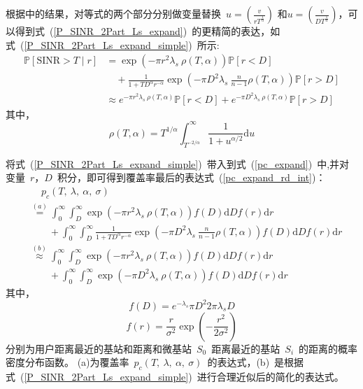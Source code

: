 根据\cite{ATractable}中的结果，对等式的两个部分分别做变量替换~$u=\left(\frac{v}{rT^{\frac{1}{\alpha}}}\right)$
和$u=\left(\frac{v}{DT^{\frac{1}{\alpha}}}\right)$，可以得到式~(\ref{P_SINR_2Part_Ls_expand})~的更精简的表达，如式~(\ref{P_SINR_2Part_Ls_expand_simple})~所示:
\begin{equation}\label{P_SINR_2Part_Ls_expand_simple}
  \begin{aligned}
  \mathbb{P}[\mathrm{SINR}>T \mid r] &= \exp\left(-\pi r^2\lambda_s\  \rho(T,\alpha)  \right)\mathbb{P}[r<D] \\
     &\quad + \frac{1}{1+ T D ^\alpha r^{-\alpha}} \exp\left(-\pi D ^2 \lambda_s\ \frac{n}{n-1} \rho(T,\alpha)\right)\mathbb{P}[r>D]\\
    &\approx  e^{-\pi r^2\lambda_s\  \rho(T,\alpha)  }\mathbb{P}[r<D]
    + e^{-\pi D ^2 \lambda_s\ \rho(T,\alpha)}\mathbb{P}[r>D]
\end{aligned}\end{equation}
其中，
\begin{equation}\label{rho}
  \rho(T,\alpha) = T ^{1/\alpha} \int_{T^{-2/\alpha}}^{\infty} \frac{1}{1+u^{\alpha/2}}\mathrm{d}u
\end{equation}

将式~(\ref{P_SINR_2Part_Ls_expand_simple})~带入到式~(\ref{pc_expand})~中,并对变量~$r$，$D$~积分，即可得到覆盖率最后的表达式~(\ref{pc_expand_rd_int})：
\begin{equation}\label{pc_expand_rd_int}
  \begin{aligned}
    &\quad\ p_c(T,~\lambda,~\alpha,~\sigma) \\
    &\overset{(a)}{=}\int_0^\infty  \int_D^{\infty}   \exp\left(-\pi r^2\lambda_s\  \rho(T,\alpha)  \right) f(D)    \mathrm{d} D f(r) \mathrm{d} r\\
    & \qquad + \int_0^\infty  \int_D^{\infty}   \frac{1}{1+ T D ^\alpha r^{-\alpha}} \exp\left(-\pi D ^2 \lambda_s\ \frac{n}{n-1} \rho(T,\alpha)\right) f(D)    \mathrm{d} D f(r) \mathrm{d} r\\
    &\overset{(b)}{\approx} \int_0^\infty  \int_D^{\infty}   \exp\left(-\pi r^2\lambda_s\  \rho(T,\alpha)  \right) f(D)    \mathrm{d} D f(r) \mathrm{d} r\\
    & \qquad + \int_0^\infty  \int_D^{\infty}   \exp\left(-\pi D ^2 \lambda_s\ \rho(T,\alpha)\right) f(D)    \mathrm{d} D f(r) \mathrm{d} r
  \end{aligned}
\end{equation}
其中，
\begin{equation}
  f(D) = e^{-\lambda_s}\pi D^2 2 \pi \lambda_s D
\end{equation}
\begin{equation}
  f(r) = \frac{r}{\sigma^2}\exp(-\frac{r^2}{2\sigma^2})
\end{equation}
分别为用户距离最近的基站和距离和微基站~$S_0$~距离最近的基站~$S_i$~的距离的概率密度分布函数。
(a)为覆盖率~$p_c(T,~\lambda,~\alpha,~\sigma)$~的表达式，(b)~是根据式~(\ref{P_SINR_2Part_Ls_expand_simple})~进行合理近似后的简化的表达式。

